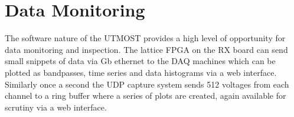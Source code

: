 \section{Data Monitoring }

The software nature of the UTMOST provides a high level of opportunity for data monitoring and inspection. The lattice FPGA on the RX board can send small snippets of data via Gb ethernet to the DAQ machines which can be plotted as bandpasses, time series and data histograms via a web interface. Similarly once a second the UDP capture system sends 512 voltages from each channel to a ring buffer where a series of plots are created, again available for scrutiny via a web interface.
